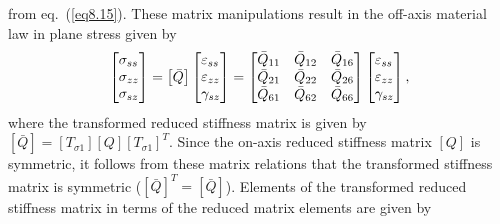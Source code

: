 \documentclass{AeroStructure-ERJohnson}
\begin{document}
from eq.~(\ref{eq8.15}). These matrix manipulations result in the
off-axis material law in plane stress given by
\begin{align}\label{eq8.30}
\left[\begin{array}{@{}l@{}} \sigma_{s s}\\
\sigma_{z z}\\
\sigma_{s z} \end{array}\right]=\left[\begin{array}{@{}l@{}}
\bar{Q} \end{array}\right]\left[\begin{array}{@{}l@{}}
\varepsilon_{s s}\\
\varepsilon_{z z}\\
\gamma_{s z}
\end{array}\right]=\left[\begin{array}{@{}lll@{}} \bar{Q}_{11} &
\bar{Q}_{12} & \bar{Q}_{16}\\
\bar{Q}_{21} & \bar{Q}_{22} &
\bar{Q}_{26}\\
\bar{Q}_{61} & \bar{Q}_{62} & \bar{Q}_{66}
\end{array}\right]\left[\begin{array}{@{}l@{}} \varepsilon_{s s}\\
\varepsilon_{z z}\\
\gamma_{s z} \end{array}\right] ,
\end{align}
where the transformed reduced stiffness matrix is given by $
[\bar{Q}]=\left[T_{\sigma 1}\right][Q]\left[T_{\sigma
1}\right]^{T} $. Since the on-axis reduced stiffness matrix $ [Q]
$ is symmetric, it follows from these matrix relations that the
transformed stiffness matrix is symmetric
($[\bar{Q}]^{T}=[\bar{Q}]$). Elements of the transformed reduced
stiffness matrix in terms of the reduced matrix elements are given
by
\end{document}
